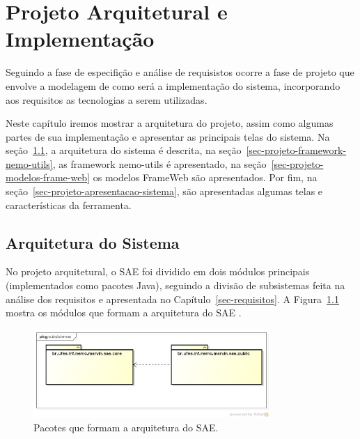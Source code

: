 
\chapter{Projeto Arquitetural e Implementação}
\label{sec-projeto}


Seguindo a fase de especifição e análise de requisistos ocorre a fase de projeto que envolve a modelagem de como será a implementação do sistema, incorporando aos requisitos as tecnologias a serem utilizadas. 

Neste capítulo iremos mostrar a arquitetura do projeto, assim como algumas partes de sua implementação e apresentar as principais telas do sistema. Na seção~\ref{sec-projeto-arquitetura-sistema}, a arquitetura do sistema é descrita, na seção~\ref{sec-projeto-framework-nemo-utils}, as framework nemo-utils é apresentado, na seção~\ref{sec-projeto-modelos-frame-web} os modelos FrameWeb são apresentados. Por fim, na seção~\ref{sec-projeto-apresentacao-sistema}, são apresentadas algumas telas e características da ferramenta. 







\section{Arquitetura do Sistema}
\label{sec-projeto-arquitetura-sistema}

No projeto arquitetural, o SAE foi dividido em dois módulos principais (implementados como pacotes Java), seguindo a divisão de subsistemas feita na análise dos requisitos e apresentada no Capítulo~\ref{sec-requisitos}. A Figura~\ref{fig-projeto-diagrama-pacotes} mostra os módulos que formam a arquitetura do SAE	.

\begin{figure}[h]
	\centering
	\includegraphics[width=0.8\textwidth]{figuras/projeto/fig-projeto-diagrama-pacotes}
	\caption{Pacotes que formam a arquitetura do SAE.}
	\label{fig-projeto-diagrama-pacotes}
\end{figure}



